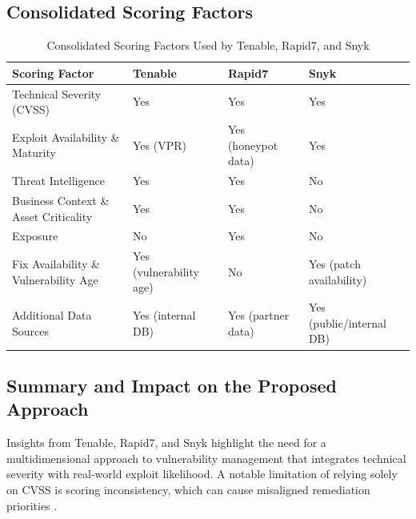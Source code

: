 \subsection*{Consolidated Scoring Factors}
\label{subsec:consolidated_scoring_factors}

\begin{table}[H]
	\centering
	\caption{Consolidated Scoring Factors Used by Tenable, Rapid7, and Snyk}
	\label{tab:consolidated_scoring_factors}
	\begin{tabular}{|p{3.5cm}|p{3.2cm}|p{3.2cm}|p{3.2cm}|}
		\hline
		\textbf{Scoring Factor}               & \textbf{Tenable}               & \textbf{Rapid7}               & \textbf{Snyk}                   \\ \hline
		Technical Severity (CVSS)             & Yes & Yes & Yes                             \\ \hline
		Exploit Availability \& Maturity      & Yes (VPR)                      & Yes (honeypot data)    & Yes                             \\ \hline
		Threat Intelligence                   & Yes                            & Yes              & No                              \\ \hline
		Business Context \& Asset Criticality & Yes                            & Yes                           & No                              \\ \hline
		Exposure                              & No                             & Yes                           & No                              \\ \hline
		Fix Availability \& Vulnerability Age & Yes (vulnerability age) & No                            & Yes (patch availability) \\ \hline
		Additional Data Sources               & Yes (internal DB)       & Yes (partner data)     & Yes (public/internal DB) \\ \hline
	\end{tabular}
\end{table}

\subsection*{Summary and Impact on the Proposed Approach}
\label{subsec:summary_impact}

Insights from Tenable, Rapid7, and Snyk highlight the need for a multidimensional approach to vulnerability management that integrates technical severity with real-world exploit likelihood. A notable limitation of relying solely on \ac{CVSS} is scoring inconsistency, which can cause misaligned remediation priorities \autocite{spring_time_2021}.

